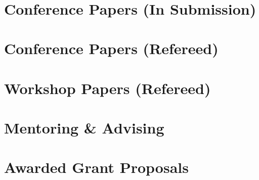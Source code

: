 \documentclass[line]{res}
\begin{document}
\begin{resume}

\vspace{-0.4cm} 

\section{\large Conference Papers (In Submission)}

\vspace{0.2cm}

\vspace{-0.4cm}


\section{\large Conference Papers (Refereed)}
\vspace{0.1cm}

\vspace{-0.4cm}

\section{\large Workshop Papers (Refereed)} \vspace{0.3cm}

\vspace{-0.4cm}

\section{\large Mentoring \& Advising}



\section{\large Awarded Grant Proposals} \vspace{0.45cm}


\end{resume}
\end{document}
